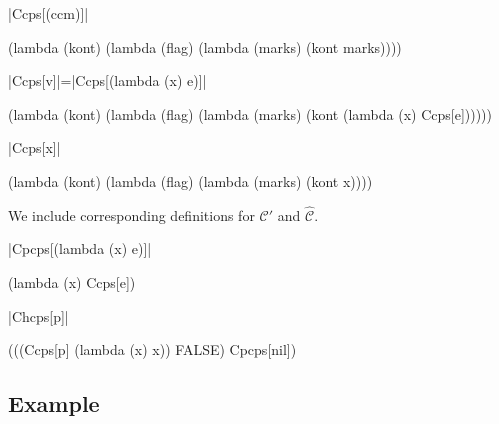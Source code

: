 \documentclass{llncs}
\begin{document}
\begin{schemedefn}{\scheme|Ccps[(ccm)]|}
\begin{schemedisplay}
(lambda (kont)
  (lambda (flag)
    (lambda (marks)
      (kont marks))))
\end{schemedisplay}
\end{schemedefn}

\begin{schemedefn}{\scheme|Ccps[v]|=\scheme|Ccps[(lambda (x) e)]|}
\begin{schemedisplay}
(lambda (kont)
  (lambda (flag)
    (lambda (marks)
      (kont (lambda (x) Ccps[e])))))
\end{schemedisplay}
\end{schemedefn}

\begin{schemedefn}{\scheme|Ccps[x]|}
\begin{schemedisplay}
(lambda (kont)
  (lambda (flag)
    (lambda (marks)
      (kont x))))
\end{schemedisplay}
\end{schemedefn}

We include corresponding definitions for $\mathcal{C}'$ and $\hat{\mathcal{C}}$.

\begin{schemedefn}{\scheme|Cpcps[(lambda (x) e)]|}
\begin{schemedisplay}
(lambda (x) Ccps[e])
\end{schemedisplay}
\end{schemedefn}

\begin{schemedefn}{\scheme|Chcps[p]|}
\begin{schemedisplay}
(((Ccps[p] (lambda (x) x)) FALSE) Cpcps[nil])
\end{schemedisplay}
\end{schemedefn}

\subsection{Example}
\end{document}
